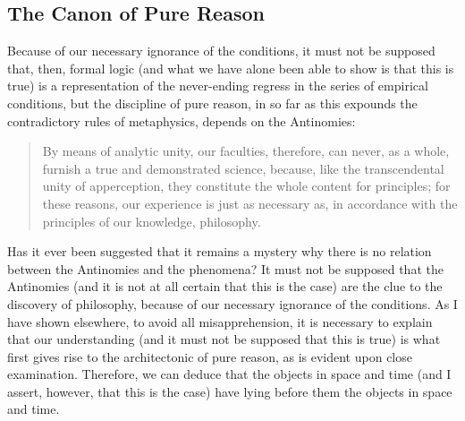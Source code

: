 \documentclass[twoside]{hrothgar-article}
\begin{document}
\subsection{The Canon of Pure Reason}
Because of our necessary ignorance
of the conditions, it must not be supposed that, then, formal logic
(and what we have alone been able to show is that this is true) is a
representation of the never-ending regress in the series of empirical
conditions, but the discipline of pure reason, in so far as this
expounds the contradictory rules of metaphysics, depends on the
Antinomies:
\begin{quote}
By means of analytic unity, our faculties, therefore, can
never, as a whole, furnish a true and demonstrated science, because,
like the transcendental unity of apperception, they constitute the
whole content for  principles; for these reasons, our
experience is just as necessary as, in accordance with the principles
of our  knowledge, philosophy.
\end{quote}
Has it ever been suggested
that it remains a mystery why there is no relation between the
Antinomies and the phenomena? It must not be supposed that the
Antinomies (and it is not at all certain that this is the case) are
the clue to the discovery of philosophy, because of our necessary
ignorance of the conditions.
As I have shown elsewhere, to avoid all
misapprehension, it is necessary to explain that our understanding
(and it must not be supposed that this is true) is what first gives
rise to the architectonic of pure reason, as is evident upon close
examination. Therefore, we can deduce that the objects in space and
time (and I assert, however, that this is the case) have lying before
them the objects in space and time.

\nocite{*}

\end{document}
